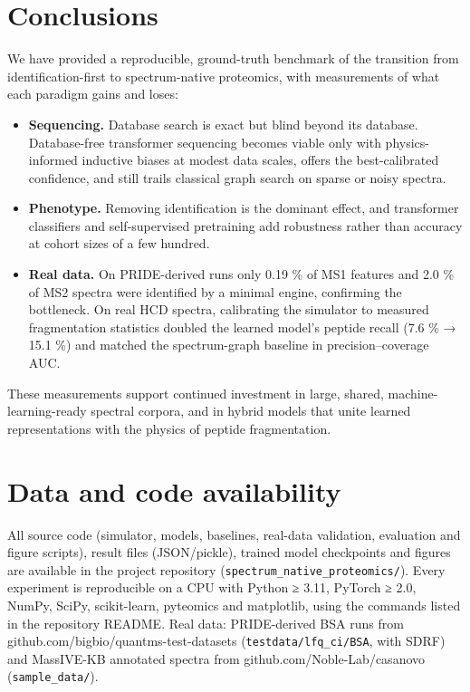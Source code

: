 \documentclass[
]{article}
\providecommand{\tightlist}{%
  \setlength{\itemsep}{0pt}\setlength{\parskip}{0pt}}
\begin{document}
\hypertarget{conclusions}{%
\section{Conclusions}\label{conclusions}}

We have provided a reproducible, ground-truth benchmark of the
transition from identification-first to spectrum-native proteomics, with
measurements of what each paradigm gains and loses:

\begin{itemize}
\tightlist
\item
  \textbf{Sequencing.} Database search is exact but blind beyond its
  database. Database-free transformer sequencing becomes viable only
  with physics-informed inductive biases at modest data scales, offers
  the best-calibrated confidence, and still trails classical graph
  search on sparse or noisy spectra.
\item
  \textbf{Phenotype.} Removing identification is the dominant effect,
  and transformer classifiers and self-supervised pretraining add
  robustness rather than accuracy at cohort sizes of a few hundred.
\item
  \textbf{Real data.} On PRIDE-derived runs only 0.19 \% of MS1 features
  and 2.0 \% of MS2 spectra were identified by a minimal engine,
  confirming the bottleneck. On real HCD spectra, calibrating the
  simulator to measured fragmentation statistics doubled the learned
  model's peptide recall (7.6 \% → 15.1 \%) and matched the
  spectrum-graph baseline in precision--coverage AUC.
\end{itemize}

These measurements support continued investment in large, shared,
machine-learning-ready spectral corpora, and in hybrid models that unite
learned representations with the physics of peptide fragmentation.

\hypertarget{data-and-code-availability}{%
\section{Data and code availability}\label{data-and-code-availability}}

All source code (simulator, models, baselines, real-data validation,
evaluation and figure scripts), result files (JSON/pickle), trained
model checkpoints and figures are available in the project repository
(\texttt{spectrum\_native\_proteomics/}). Every experiment is
reproducible on a CPU with Python ≥ 3.11, PyTorch ≥ 2.0, NumPy, SciPy,
scikit-learn, pyteomics and matplotlib, using the commands listed in the
repository README. Real data: PRIDE-derived BSA runs from
github.com/bigbio/quantms-test-datasets (\texttt{testdata/lfq\_ci/BSA},
with SDRF) and MassIVE-KB annotated spectra from
github.com/Noble-Lab/casanovo (\texttt{sample\_data/}).
\end{document}
